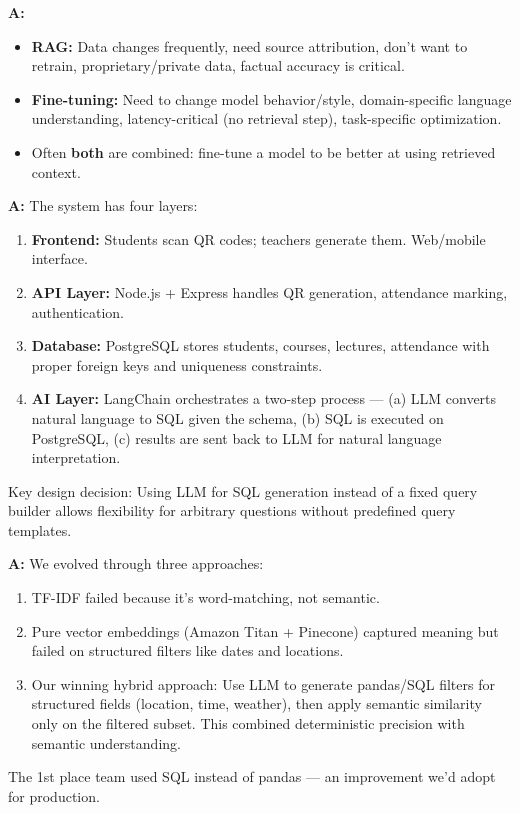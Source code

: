 \documentclass[11pt,a4paper]{article}
\begin{document}
\begin{warnbox}
\textbf{A:}
\begin{itemize}[nosep]
  \item \textbf{RAG:} Data changes frequently, need source attribution, don't want to retrain, proprietary/private data, factual accuracy is critical.
  \item \textbf{Fine-tuning:} Need to change model behavior/style, domain-specific language understanding, latency-critical (no retrieval step), task-specific optimization.
  \item Often \textbf{both} are combined: fine-tune a model to be better at using retrieved context.
\end{itemize}
\end{warnbox}

\begin{warnbox}
\textbf{A:}
The system has four layers:
\begin{enumerate}[nosep]
  \item \textbf{Frontend:} Students scan QR codes; teachers generate them. Web/mobile interface.
  \item \textbf{API Layer:} Node.js + Express handles QR generation, attendance marking, authentication.
  \item \textbf{Database:} PostgreSQL stores students, courses, lectures, attendance with proper foreign keys and uniqueness constraints.
  \item \textbf{AI Layer:} LangChain orchestrates a two-step process --- (a) LLM converts natural language to SQL given the schema, (b) SQL is executed on PostgreSQL, (c) results are sent back to LLM for natural language interpretation.
\end{enumerate}
Key design decision: Using LLM for SQL generation instead of a fixed query builder allows flexibility for arbitrary questions without predefined query templates.
\end{warnbox}

\begin{warnbox}
\textbf{A:}
We evolved through three approaches:
\begin{enumerate}[nosep]
  \item TF-IDF failed because it's word-matching, not semantic.
  \item Pure vector embeddings (Amazon Titan + Pinecone) captured meaning but failed on structured filters like dates and locations.
  \item Our winning hybrid approach: Use LLM to generate pandas/SQL filters for structured fields (location, time, weather), then apply semantic similarity only on the filtered subset. This combined deterministic precision with semantic understanding.
\end{enumerate}
The 1st place team used SQL instead of pandas --- an improvement we'd adopt for production.
\end{warnbox}
\end{document}
